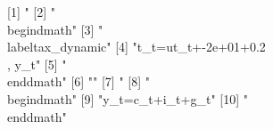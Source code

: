  [1] "%
 [2] "\\begin{dmath}"                                                                                                                                                                                                                        
 [3] "\\label{tax_dynamic}"                                                                                                                                                                                                                  
 [4] "{t_{t}}={ut_{t}}+-2e+01+0.2\\, {y_{t}}"                                                                                                                                                                                                
 [5] "\\end{dmath}"                                                                                                                                                                                                                          
 [6] ""                                                                                                                                                                                                                                      
 [7] "%
 [8] "\\begin{dmath}"                                                                                                                                                                                                                        
 [9] "{y_{t}}={c_{t}}+{i_{t}}+{g_{t}}"                                                                                                                                                                                                       
[10] "\\end{dmath}"                                                                                                                                                                                                                          
